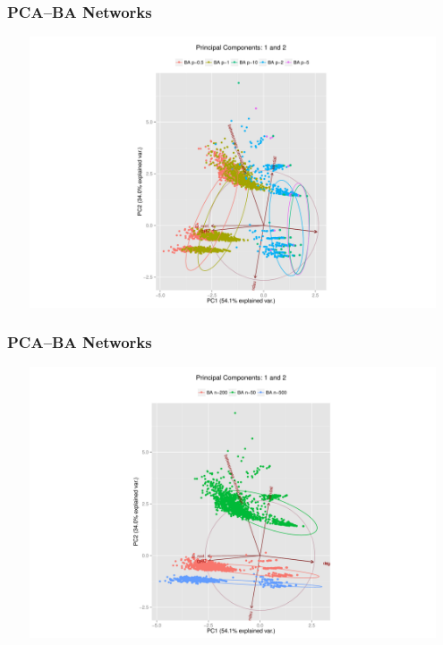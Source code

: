 \documentclass[xcolor={table}]{beamer}
\newenvironment{changemargin}[2]{%
  \begin{list}{}{%
    \setlength{\topsep}{0pt}%
    \setlength{\leftmargin}{#1}%
    \setlength{\rightmargin}{#2}%
    \setlength{\listparindent}{\parindent}%
    \setlength{\itemindent}{\parindent}%
    \setlength{\parsep}{\parskip}%
  }%
  \item[]}{\end{list}}
\begin{document}
\begin{frame}\frametitle{PCA--BA Networks}
	\begin{changemargin}{-2cm}{ -2cm}
		\centering
		\par
		\includegraphics[width=15cm, height=8cm]{images/BA_Param_PCA_Components1_2.pdf}
	\end{changemargin}
\end{frame}

\begin{frame}\frametitle{PCA--BA Networks}
	\begin{changemargin}{-2cm}{ -2cm}
		\centering
		\par
		\includegraphics[width=15cm, height=8cm]{images/BA_Size_PCA_Components1_2.pdf}
	\end{changemargin}
\end{frame}
\end{document}
